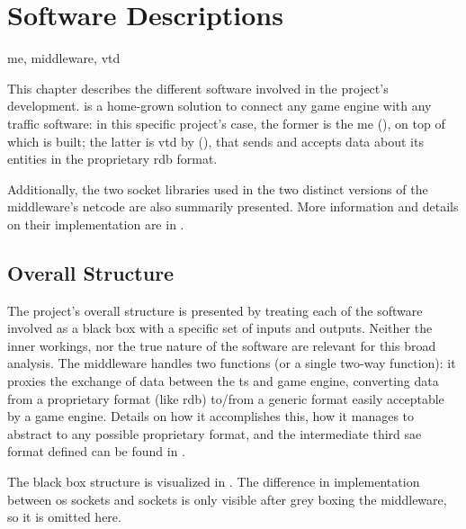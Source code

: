 \chapter{Software Descriptions}\label{ch:software}

\begin{keywords}
	me, middleware, vtd
\end{keywords}

This chapter describes the different software involved in the project's development.  is a home-grown solution to connect any game engine with any traffic software: in this specific project's case, the former is the \gls{me} (), on top of which  is built; the latter is \gls{vtd} by  (), that sends and accepts data about its entities in the proprietary \gls{rdb} format.

Additionally, the two socket libraries used in the two distinct versions of the \gls{middleware}'s netcode are also summarily presented. More information and details on their implementation are in .

\section{Overall Structure}\label{sc:software:overall}

The project's overall structure is presented by treating each of the software involved as a black box with a specific  set of inputs and outputs. Neither the inner workings, nor the true nature of the software are relevant for this broad analysis. The \gls{middleware} handles two functions (or a single two-way function): it proxies the exchange of data between the \gls{ts} and game engine, converting data from a proprietary format (like \gls{rdb}) to/from a generic format easily acceptable by a game engine. Details on how it accomplishes this, how it manages to abstract to any possible proprietary format, and the intermediate third \gls{sae} format defined can be found in .



The black box structure is visualized in . The difference in implementation between \gls{os} sockets and  sockets is only visible after grey boxing the \gls{middleware}, so it is omitted here.

